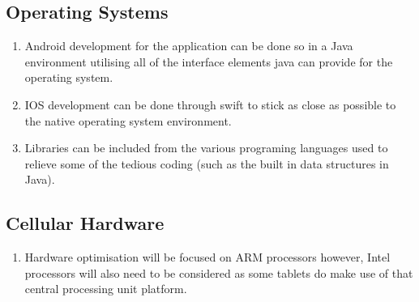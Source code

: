 \documentclass[11pt]{article}
\begin{document}
\subsection{Operating Systems}

\begin{enumerate}

\item Android development for the application can be done so in a Java environment utilising all of the interface elements java can provide for the operating system.
\item IOS development can be done through swift to stick as close as possible to the native operating system environment. 
\item Libraries can be included from the various programing languages used to relieve some of the tedious coding (such as the built in data structures in Java).

\end{enumerate}

\subsection{Cellular Hardware}

\begin{enumerate}

\item Hardware optimisation will be focused on ARM processors however, Intel processors will also need to be considered as some tablets do make use of that central processing unit platform.

\end{enumerate}
\end{document}
